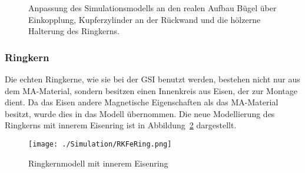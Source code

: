             \begin{figure}[htb]
                \centering
                \hspace{0.01\textwidth}
                \hspace{0.01\textwidth}
                \caption{Anpassung des Simulationsmodells an den realen Aufbau \protect{} Bügel über Einkopplung, \protect{} Kupferzylinder an der Rückwand und \protect{} die hölzerne Halterung des Ringkerns.}
                \label{fig:AnpassungCST}
            \end{figure}
        
            \subsubsection{Ringkern}
            Die echten Ringkerne, wie sie bei der GSI benutzt werden, bestehen nicht nur aus dem MA-Material, sondern besitzen einen Innenkreis aus Eisen, der zur Montage dient. Da das Eisen andere Magnetische Eigenschaften als das MA-Material besitzt, wurde dies in das Modell übernommen. Die neue Modellierung des Ringkerns mit innerem Eisenring ist in Abbildung~\ref{fig:RKFeRingCST} dargestellt.
                
                \begin{figure}[htb]
                    \centering
                    \texttt{[image: ./Simulation/RKFeRing.png]}
                    \caption{Ringkernmodell mit innerem Eisenring}
                    \label{fig:RKFeRingCST}
                \end{figure}
            
